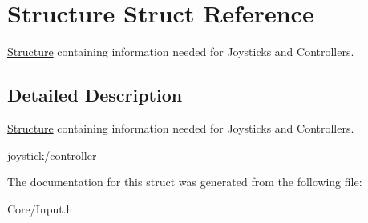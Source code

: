 \hypertarget{struct_structure}{}\section{Structure Struct Reference}
\label{struct_structure}


\hyperlink{struct_structure}{Structure} containing information needed for Joysticks and Controllers.  




\subsection{Detailed Description}
\hyperlink{struct_structure}{Structure} containing information needed for Joysticks and Controllers. 

joystick/controller 

The documentation for this struct was generated from the following file\+:\begin{DoxyCompactItemize}
\item 
Core/Input.\+h\end{DoxyCompactItemize}
